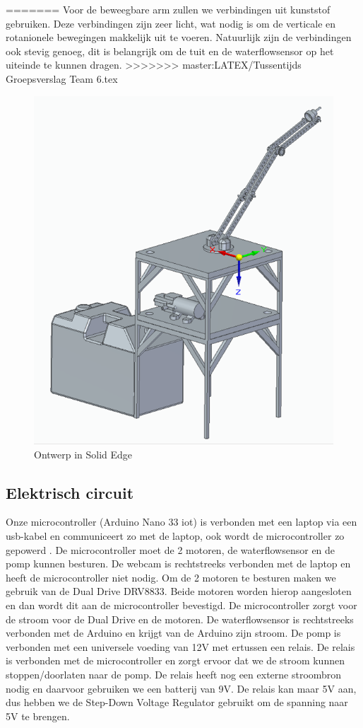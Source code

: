 \documentclass[kulak]{kulakarticle} %
\begin{document}
=======
		Voor de beweegbare arm zullen we verbindingen uit kunststof gebruiken. Deze verbindingen zijn zeer licht, wat nodig is om de verticale en rotanionele bewegingen makkelijk uit te voeren. Natuurlijk zijn de verbindingen ook stevig genoeg, dit is belangrijk om de tuit en de waterflowsensor op het uiteinde te kunnen dragen.
>>>>>>> master:LATEX/Tussentijds Groepsverslag Team 6.tex

			\begin{figure} [!h]
				\centering
				\includegraphics[width = .6 \textwidth]{Solid Edge Assembly foto}
				\caption{Ontwerp in Solid Edge}
				\label{ontwerp}
			\end{figure}
	\subsection{Elektrisch circuit}
		Onze microcontroller (Arduino Nano 33 iot) is verbonden met een laptop via een usb-kabel en communiceert zo met de laptop, ook wordt de microcontroller zo gepowerd . De microcontroller moet de 2 motoren, de waterflowsensor en de pomp kunnen besturen. De webcam is rechtstreeks verbonden met de laptop en heeft de microcontroller niet nodig. Om de 2 motoren te besturen maken we gebruik van de Dual Drive DRV8833. Beide motoren worden hierop aangesloten en dan wordt dit aan de microcontroller bevestigd. De microcontroller zorgt voor de stroom voor de Dual Drive en de motoren. De waterflowsensor is rechtstreeks verbonden met de Arduino en krijgt van de Arduino zijn stroom. De pomp is verbonden met een universele voeding van 12V met ertussen een relais. De relais is verbonden met de microcontroller en zorgt ervoor dat we de stroom kunnen stoppen/doorlaten naar de pomp. De relais heeft nog een externe stroombron nodig en daarvoor gebruiken we een batterij van 9V. De relais kan maar 5V aan, dus hebben we de Step-Down Voltage Regulator gebruikt om de spanning naar 5V te brengen. 
		
\end{document}
